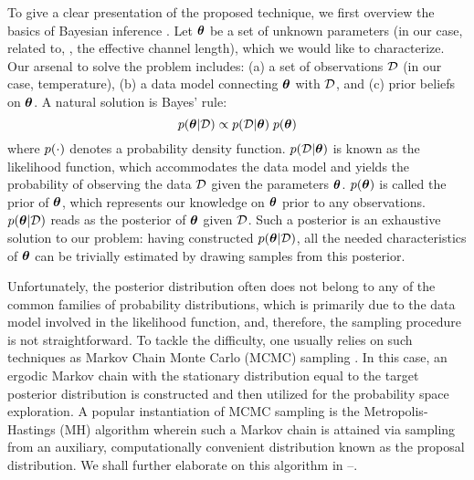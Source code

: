 To give a clear presentation of the proposed technique, we first overview the basics of Bayesian inference \cite{gelman2004}.
Let ${\boldsymbol\theta}$ be a set of unknown parameters (in our case, related to, \eg, the effective channel length), which we would like to characterize. Our arsenal to solve the problem includes: (a) a set of observations $\mathcal{D}$ (in our case, temperature), (b) a data model connecting ${\boldsymbol\theta}$ with $\mathcal{D}$, and (c) prior beliefs on ${\boldsymbol\theta}$. A natural solution is Bayes' rule:
\begin{equation} \elabel{bayes}
  \f{\vparam | \Data} \propto \f{\Data | \vparam} \; \f{\vparam}
\end{equation}
where $\f{\cdot}$ denotes a probability density function.
$\f{\Data | \vparam}$ is known as the likelihood function, which accommodates the data model and yields the probability of observing the data $\mathcal{D}$ given the parameters ${\boldsymbol\theta}$.
$\f{\vparam}$ is called the prior of ${\boldsymbol\theta}$, which represents our knowledge on ${\boldsymbol\theta}$ prior to any observations.
$\f{\vparam | \Data}$ reads as the posterior of ${\boldsymbol\theta}$ given $\mathcal{D}$.
Such a posterior is an exhaustive solution to our problem: having constructed $\f{\vparam | \Data}$, all the needed characteristics of ${\boldsymbol\theta}$ can be trivially estimated by drawing samples from this posterior.

Unfortunately, the posterior distribution often does not belong to any of the common families of probability distributions, which is primarily due to the data model involved in the likelihood function, and, therefore, the sampling procedure is not straightforward.
To tackle the difficulty, one usually relies on such techniques as Markov Chain Monte Carlo (MCMC) sampling \cite{gelman2004}. In this case, an ergodic Markov chain with the stationary distribution equal to the target posterior distribution is constructed and then utilized for the probability space exploration.
A popular instantiation of MCMC sampling is the Metropolis-Hastings (MH) algorithm wherein such a Markov chain is attained via sampling from an auxiliary, computationally convenient distribution known as the proposal distribution. We shall further elaborate on this algorithm in --.
